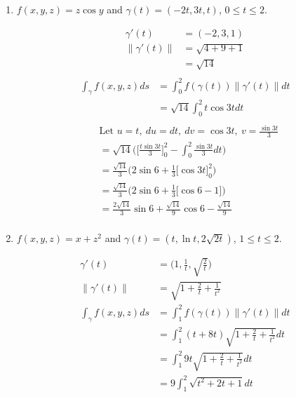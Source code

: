 \documentclass{article}
\newcommand{\norm}[1]{\| #1 \|}
\begin{document}
\begin{enumerate}
\begin{enumerate}
    \item $f(x,y,z) = z \cos y$ and $\gamma(t) = (-2t,3t,t)$, $0\leq t \leq 2$.
    \begin{multicols}{2} 
    \noindent
    \begin{align*} 
        \gamma'(t) &= (-2,3,1) \\
        \norm{\gamma'(t)} &= \sqrt{4 + 9 + 1} \\
        &= \sqrt{14} \\
    \end{align*}
    \begin{align*} 
        \int_{\gamma}f(x,y,z)ds &= \int_0^2 f(\gamma(t)) \norm{\gamma'(t)}dt \\
        &= \sqrt{14} \int_0^2 t \cos 3t dt \\
    \end{align*}
    \begin{align*} 
        &\text{Let } u = t,\: du = dt, \: dv = \cos 3t, \: v = \frac{\sin 3t}{3}\\
        &= \sqrt{14} \Big( \Big[ \frac{ t \sin 3t}{3} \Big]_0^2 - \int_0^2 \frac{ \sin 3t}{3} dt \Big) \\
        &= \frac{\sqrt{14}}{3} \Big( 2\sin 6 + \frac{1}{3}\Big[ \cos 3t \Big]_0^2 \Big) \\
        &= \frac{\sqrt{14}}{3} \Big( 2\sin 6 + \frac{1}{3}\Big[ \cos 6 - 1 \Big] \Big) \\
        &= \frac{2\sqrt{14}}{3}\sin 6 + \frac{\sqrt{14}}{9}\cos 6 -\frac{\sqrt{14}}{9} \\
    \end{align*}
    \end{multicols}
    \item $f(x,y,z) = x + z^2 $ and $\gamma(t) = (t,\ln t, 2\sqrt{2t})$, $1\leq t \leq 2$.
    \begin{multicols}{2} 
    \begin{align*} 
        \gamma'(t) &= \Big( 1,\frac{1}{t},\sqrt{\frac{2}{t}} \Big) \\
        \norm{\gamma'(t)} &= \sqrt{1 + \frac{2}{t} + \frac{1}{t^2} } \\
        \int_{\gamma}f(x,y,z)ds &= \int_1^2 f(\gamma(t)) \norm{\gamma'(t)}dt \\
        &= \int_1^2 (t + 8t) \sqrt{1 + \frac{2}{t} + \frac{1}{t^2} }dt \\
        &= \int_1^2 9t \sqrt{1 + \frac{2}{t} + \frac{1}{t^2} } dt \\
        &= 9 \int_1^2 \sqrt{t^2 + 2t +  1} dt \\

\end{align*}
\end{multicols}
\end{enumerate}
\end{enumerate}
\end{document}
